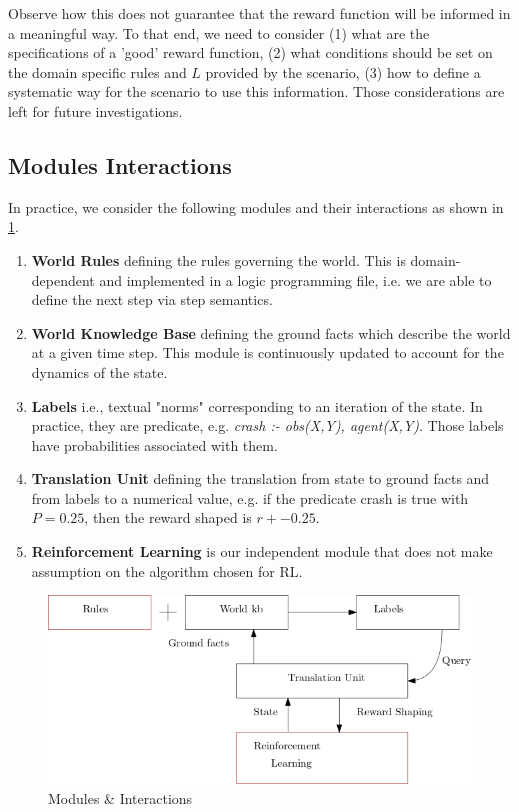 Observe how this does not guarantee that the reward function will be informed in a meaningful way.
To that end, we need to consider (1) what are the specifications of a 'good' reward function, (2) what conditions should be set 
on the domain specific rules and $L$ provided by the scenario, (3) how to define a systematic way for the scenario to use 
this information. Those considerations are left for future investigations. 
 

\subsection{Modules Interactions}
In practice, we consider the following modules and their interactions as shown in \ref{fig:mods}.

\begin{enumerate}
  \item \textbf{World Rules} defining the rules governing the world. This is domain-dependent and implemented 
        in a logic programming file, i.e. we are able to define the next step via step semantics.
  \item \textbf{World Knowledge Base} defining the ground facts which describe the world at a given time step. This module is 
        continuously updated to account for the dynamics of the state. 
  \item \textbf{Labels} i.e., textual "norms" corresponding to an iteration of the state. In practice, they are predicate, e.g. \textit{crash :- obs(X,Y), agent(X,Y)}. 
                    Those labels have probabilities associated with them.
  \item \textbf{Translation Unit} defining the translation from state to ground facts and from labels to a numerical value, e.g. if the predicate crash is true with $P = 0.25$, then the reward shaped is $r + -0.25$. 
  \item \textbf{Reinforcement Learning} is our independent module that does not make assumption on the algorithm chosen for RL.
\end{enumerate}


\begin{figure}[H]
  \centering
  \includegraphics[scale=0.55]{figures/dynamics.png}
  \caption{Modules \& Interactions}
  \label{fig:mods}
\end{figure}

